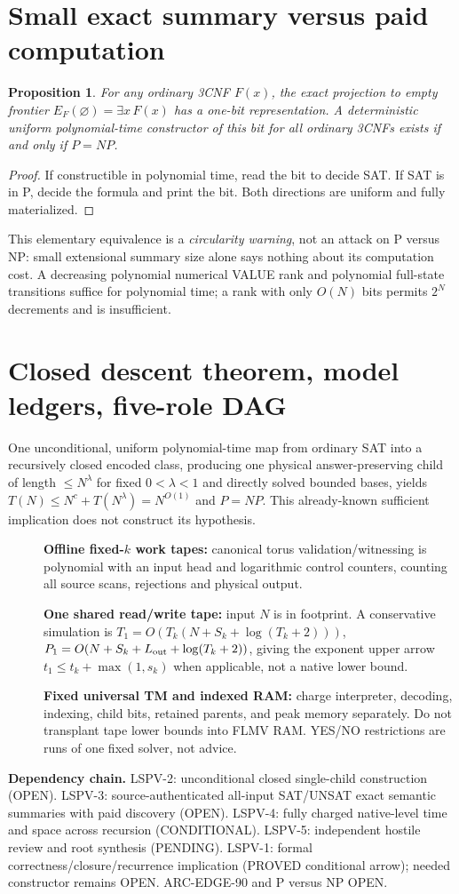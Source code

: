 \documentclass[11pt]{article}
\newtheorem{proposition}[theorem]{Proposition}
\begin{document}
\section{Small exact summary versus paid computation}
\begin{proposition}
For any ordinary 3CNF $F(x)$, the exact projection to empty frontier $E_F(\varnothing)=\exists x\,F(x)$ has a one-bit representation. A deterministic uniform polynomial-time constructor of this bit for all ordinary 3CNFs exists if and only if $P=NP$.
\end{proposition}
\begin{proof}
If constructible in polynomial time, read the bit to decide SAT. If SAT is in P, decide the formula and print the bit. Both directions are uniform and fully materialized.
\end{proof}
This elementary equivalence is a \emph{circularity warning}, not an attack on P versus NP: small extensional summary size alone says nothing about its computation cost. A decreasing polynomial numerical VALUE rank and polynomial full-state transitions suffice for polynomial time; a rank with only $O(N)$ bits permits $2^N$ decrements and is insufficient.
\section{Closed descent theorem, model ledgers, five-role DAG}
One unconditional, uniform polynomial-time map from ordinary SAT into a recursively closed encoded class, producing one physical answer-preserving child of length $\le N^\lambda$ for fixed $0<\lambda<1$ and directly solved bounded bases, yields $T(N)\le N^c+T(N^\lambda)=N^{O(1)}$ and $P=NP$. This already-known sufficient implication does not construct its hypothesis.
\begin{description}
\item[] \textbf{Offline fixed-$k$ work tapes:} canonical torus validation/witnessing is polynomial with an input head and logarithmic control counters, counting all source scans, rejections and physical output.
\item[] \textbf{One shared read/write tape:} input $N$ is in footprint. A conservative simulation is $T_1=O(T_k(N+S_k+\log(T_k+2)))$, $P_1=O(N+S_k+L_{\rm out}+\log(T_k+2))$, giving the exponent upper arrow $t_1\le t_k+\max(1,s_k)$ when applicable, not a native lower bound.
\item[] \textbf{Fixed universal TM and indexed RAM:} charge interpreter, decoding, indexing, child bits, retained parents, and peak memory separately. Do not transplant tape lower bounds into FLMV RAM. YES/NO restrictions are runs of one fixed solver, not advice.
\end{description}
\noindent\textbf{Dependency chain.} LSPV-2: unconditional closed single-child construction (OPEN). LSPV-3: source-authenticated all-input SAT/UNSAT exact semantic summaries with paid discovery (OPEN). LSPV-4: fully charged native-level time and space across recursion (CONDITIONAL). LSPV-5: independent hostile review and root synthesis (PENDING). LSPV-1: formal correctness/closure/recurrence implication (PROVED conditional arrow); needed constructor remains OPEN. ARC-EDGE-90 and P versus NP OPEN.
\end{document}
